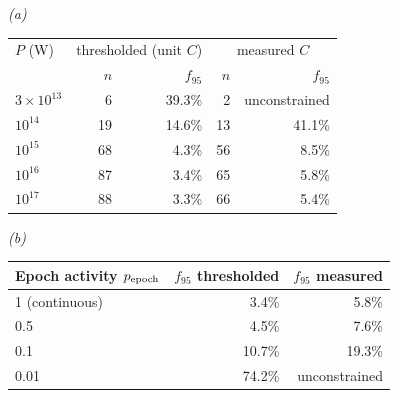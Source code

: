 \emph{(a)}\\[2pt]
\begin{tabular}{@{}lrrrr@{}}
\toprule
$P$ (W) & \multicolumn{2}{c}{thresholded (unit $C$)} &
\multicolumn{2}{c}{measured $C$} \\
 & $n$ & $f_{95}$ & $n$ & $f_{95}$ \\
\midrule
$3\times10^{13}$ & 6 & 39.3\% & 2 & unconstrained \\
$10^{14}$ & 19 & 14.6\% & 13 & 41.1\% \\
$10^{15}$ & 68 & 4.3\% & 56 & 8.5\% \\
$10^{16}$ & 87 & 3.4\% & 65 & 5.8\% \\
$10^{17}$ & 88 & 3.3\% & 66 & 5.4\% \\
\bottomrule
\end{tabular}

\smallskip
\emph{(b)}\\[2pt]
\begin{tabular}{@{}lrr@{}}
\toprule
Epoch activity $p_{\rm epoch}$ & $f_{95}$ thresholded & $f_{95}$ measured \\
\midrule
1 (continuous) & 3.4\% & 5.8\% \\
0.5 & 4.5\% & 7.6\% \\
0.1 & 10.7\% & 19.3\% \\
0.01 & 74.2\% & unconstrained \\
\bottomrule
\end{tabular}
